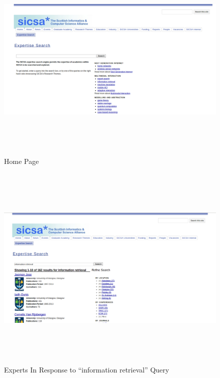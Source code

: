 \begin{figure}
 \centering
\includegraphics[width=13cm,height=10cm,keepaspectratio]{./figures/oldsicsa.png}
 \caption{Home Page} \label{fig:oldsicsa} 
 \end{figure}
 \begin{figure}
 \centering
 \includegraphics[width=13cm,height=10cm,keepaspectratio]{./figures/oldsearch.png}
 \caption{Experts In Response to ``information retrieval'' Query} \label{fig:resultspage} 
 \end{figure}
